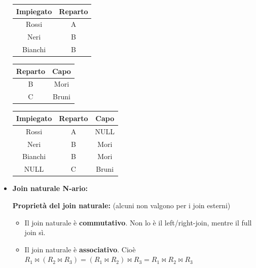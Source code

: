\documentclass{article}
\newcommand{\sitemize}[1]{%
  \begin{itemize}[label=$\diamond$]
    #1
  \end{itemize}
}
\begin{document}
\begin{itemize}
{\begin{minipage}{.25\textwidth}
  \centering
    \begin{tabular}{|c|c|}
        \hline
        \textbf{Impiegato} & \textbf{Reparto} \\
        \hline
        Rossi & A \\
        \hline
        Neri &  B \\
        \hline
        Bianchi & B \\
         \hline
        \end{tabular}
\end{minipage}%
\hfill
\begin{minipage}{.25\textwidth}
  \centering
       \begin{tabular}{|c|c|}
        \hline
        \textbf{Reparto} & \textbf{Capo} \\
        \hline
        B & Mori\\
        \hline
        C & Bruni\\
         \hline
        \end{tabular}
\end{minipage}
\hfill
\begin{minipage}{.25\textwidth}
  \centering
       \begin{tabular}{|c|c|c|}
        \hline
        \textbf{Impiegato} & \textbf{Reparto} & \textbf{Capo} \\
        \hline
        Rossi & A & NULL\\
        \hline
        Neri & B & Mori\\
         \hline
         Bianchi & B & Mori\\
         \hline
        NULL & C & Bruni\\
         \hline
        \end{tabular}
\hspace{1em}
\end{minipage}
}

\newpage
\item \textbf{Join naturale N-ario:}

\textbf{Proprietà del join naturale:} (alcuni non valgono per i join esterni) 

\sitemize{
\item Il join naturale è \textbf{commutativo}. Non lo è il left/right-join, mentre il full join sì.
\item Il join naturale è \textbf{associativo}. Cioè $R_1 \bowtie (R_2 \bowtie R_3) = (R_1 \bowtie R_2) \bowtie R_3 = R_1 \bowtie R_2 \bowtie R_3$

}
\end{itemize}
\end{document}
